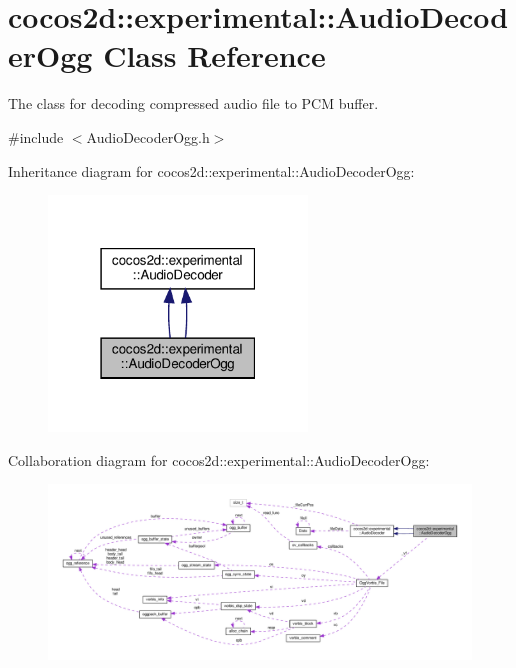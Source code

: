 \hypertarget{classcocos2d_1_1experimental_1_1AudioDecoderOgg}{}\section{cocos2d\+:\+:experimental\+:\+:Audio\+Decoder\+Ogg Class Reference}
\label{classcocos2d_1_1experimental_1_1AudioDecoderOgg}


The class for decoding compressed audio file to P\+CM buffer.  




{\ttfamily \#include $<$Audio\+Decoder\+Ogg.\+h$>$}



Inheritance diagram for cocos2d\+:\+:experimental\+:\+:Audio\+Decoder\+Ogg\+:
\nopagebreak
\begin{figure}[H]
\begin{center}
\leavevmode
\includegraphics[width=195pt]{classcocos2d_1_1experimental_1_1AudioDecoderOgg__inherit__graph}
\end{center}
\end{figure}


Collaboration diagram for cocos2d\+:\+:experimental\+:\+:Audio\+Decoder\+Ogg\+:
\nopagebreak
\begin{figure}[H]
\begin{center}
\leavevmode
\includegraphics[width=350pt]{classcocos2d_1_1experimental_1_1AudioDecoderOgg__coll__graph}
\end{center}
\end{figure}

